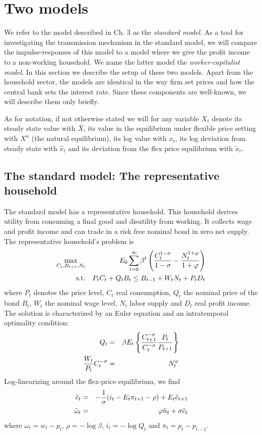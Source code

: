 \section{Two models}
\label{sec:model}
We refer to the model described in \citet{Gali1999} Ch. 3 as the \emph{standard model}. As a tool for investigating the transmission mechanism in the standard model, we will compare the impulse-responses of this model to a model where we give the profit income to a non-working household. We name the latter model the \emph{worker-capitalist model}. In this section we describe the setup of these two models. Apart from the household sector, the models are identical in the way firm set prices and how the central bank sets the interest rate. Since these components are well-known, we will describe them only briefly.  

As for notation, if not otherwise stated we will for any variable $X_t$ denote its steady state value with $\bar X$, its value in the equilibrium under flexible price setting with $X^n$ (the natural equilibrium), its log value with $x_t$, its log deviation from steady state with $\hat x_t$ and its deviation from the flex price equilibrium with $\tilde x_t$.

\subsection{The standard model: The representative household}
The standard model has a representative household. This household derives utility from consuming a final good and disutility from working. It collects wage and profit income and can trade in a risk free nominal bond in zero net supply. The representative household's problem is
\begin{eqnarray}
\max_{C_{t}, B_{t+1}, N_t} && E_0 \sum_{t=0}^{\infty} \beta^t \left( \frac{C_{t}^{1-\sigma}}{1-\sigma}-\frac{N_t^{1+\varphi}}{1+\varphi}\right) \nonumber\\
\lb{rephouse_bc}
\text{s.t.} && P_t C_{t} + Q_{t} B_{t} \leq B_{t-1} + W_t N_t + P_t D_t \nonumber
\end{eqnarray}
where $P_t$ denotes the price level, $C_t$ real consumption, $Q_t$ the nominal price of the bond $B_t$, $W_t$ the nominal wage level, $N_t$ labor supply and $D_t$ real profit income. The solution is characterized by an Euler equation and an intratemporal optimality condition:
\begin{eqnarray}
\lb{std_euler}
Q_{t} &=& \beta E_t \left\{\frac{C^{-\sigma }_{t+1}}{C^{-\sigma }_{t}} \frac{P_t}{P_{t+1}}\right\} \nonumber \\
\lb{std_labor}
\frac{W_t}{P_t}C_{t}^{-\sigma} &=& N_t^{\varphi} \nonumber
\end{eqnarray}
Log-linearizing around the flex-price equilibrium, we find  
\begin{eqnarray}
\lb{std_euler_log}
\tilde c_{t} &=& -\frac{1}{\sigma}(i_t-E_t \pi_{t+1}-\rho) + E_t \tilde c_{t+1} \\
\lb{std_labor_log}
\tilde \omega_t &=& \varphi \tilde n_t + \sigma \tilde c_t
\end{eqnarray}
where $\omega_t=w_t-p_t$, $\rho=-\log \beta$, $i_t=-\log{Q_t}$ and $\pi_t = p_t-p_{t-1}$. 

